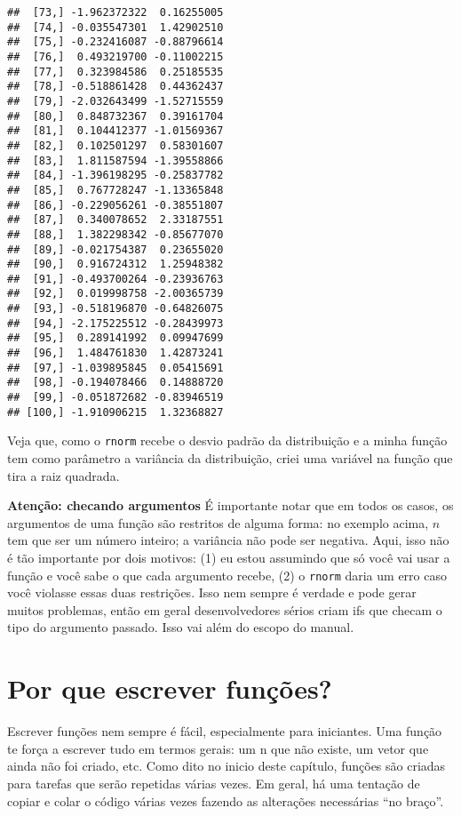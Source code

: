 \documentclass[]{book}
\begin{document}
\begin{verbatim}
##  [73,] -1.962372322  0.16255005
##  [74,] -0.035547301  1.42902510
##  [75,] -0.232416087 -0.88796614
##  [76,]  0.493219700 -0.11002215
##  [77,]  0.323984586  0.25185535
##  [78,] -0.518861428  0.44362437
##  [79,] -2.032643499 -1.52715559
##  [80,]  0.848732367  0.39161704
##  [81,]  0.104412377 -1.01569367
##  [82,]  0.102501297  0.58301607
##  [83,]  1.811587594 -1.39558866
##  [84,] -1.396198295 -0.25837782
##  [85,]  0.767728247 -1.13365848
##  [86,] -0.229056261 -0.38551807
##  [87,]  0.340078652  2.33187551
##  [88,]  1.382298342 -0.85677070
##  [89,] -0.021754387  0.23655020
##  [90,]  0.916724312  1.25948382
##  [91,] -0.493700264 -0.23936763
##  [92,]  0.019998758 -2.00365739
##  [93,] -0.518196870 -0.64826075
##  [94,] -2.175225512 -0.28439973
##  [95,]  0.289141992  0.09947699
##  [96,]  1.484761830  1.42873241
##  [97,] -1.039895845  0.05415691
##  [98,] -0.194078466  0.14888720
##  [99,] -0.051872682 -0.83946519
## [100,] -1.910906215  1.32368827
\end{verbatim}

Veja que, como o \texttt{rnorm} recebe o desvio padrão da distribuição e
a minha função tem como parâmetro a variância da distribuição, criei uma
variável na função que tira a raiz quadrada.

\textbf{Atenção: checando argumentos} É importante notar que em todos os
casos, os argumentos de uma função são restritos de alguma forma: no
exemplo acima, \(n\) tem que ser um número inteiro; a variância não pode
ser negativa. Aqui, isso não é tão importante por dois motivos: (1) eu
estou assumindo que só você vai usar a função e você sabe o que cada
argumento recebe, (2) o \texttt{rnorm} daria um erro caso você violasse
essas duas restrições. Isso nem sempre é verdade e pode gerar muitos
problemas, então em geral desenvolvedores sérios criam ifs que checam o
tipo do argumento passado. Isso vai além do escopo do manual.

\section{Por que escrever funções?}\label{por-que-escrever-funcoes}

Escrever funções nem sempre é fácil, especialmente para iniciantes. Uma
função te força a escrever tudo em termos gerais: um n que não existe,
um vetor que ainda não foi criado, etc. Como dito no inicio deste
capítulo, funções são criadas para tarefas que serão repetidas várias
vezes. Em geral, há uma tentação de copiar e colar o código várias vezes
fazendo as alterações necessárias ``no braço''.
\end{document}
